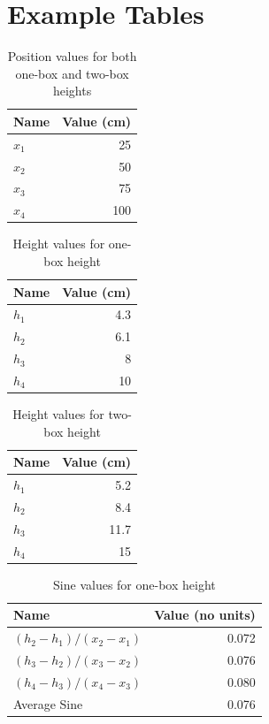 \section{Example Tables}
%
\begin{table}[ht]
    \centering
    \begin{tabular}{l|r}
        \textbf{Name} & \textbf{Value} (cm) \\
        \hline
        $x_{1}$ & 25 \\
        $x_{2}$ & 50 \\
        $x_{3}$ & 75 \\
        $x_{4}$ & 100 \\
        \hline
    \end{tabular}
    \caption{Position values for both one-box and two-box heights}
    \label{table:07.x}
\end{table}
%
\begin{table}[ht]
    \centering
    \begin{tabular}{l|r}
        \textbf{Name} & \textbf{Value} (cm) \\
        \hline
        $h_{1}$ & 4.3 \\
        $h_{2}$ & 6.1 \\
        $h_{3}$ & 8 \\
        $h_{4}$ & 10 \\
        \hline
    \end{tabular}
    \caption{Height values for one-box height}
    \label{table:07.h.1}
\end{table}
%
\begin{table}[ht]
    \centering
    \begin{tabular}{l|r}
        \textbf{Name} & \textbf{Value} (cm) \\
        \hline
        $h_{1}$ & 5.2 \\
        $h_{2}$ & 8.4 \\
        $h_{3}$ & 11.7 \\
        $h_{4}$ & 15 \\
        \hline
    \end{tabular}
    \caption{Height values for two-box height}
    \label{table:07.h.2}
\end{table}
%
\begin{table}[ht]
    \centering
    \begin{tabular}{l|r}
        \textbf{Name} & \textbf{Value} (no units) \\
        \hline
        $\left( h_{2} - h_{1} \right) / \left( x_{2} - x_{1} \right)$ & 0.072 \\
        $\left( h_{3} - h_{2} \right) / \left( x_{3} - x_{2} \right)$ & 0.076 \\
        $\left( h_{4} - h_{3} \right) / \left( x_{4} - x_{3} \right)$ & 0.080 \\
        \hline
        Average Sine & 0.076 \\
        \hline
    \end{tabular}
    \caption{Sine values for one-box height}
    \label{table:07.sine.1}
\end{table}
